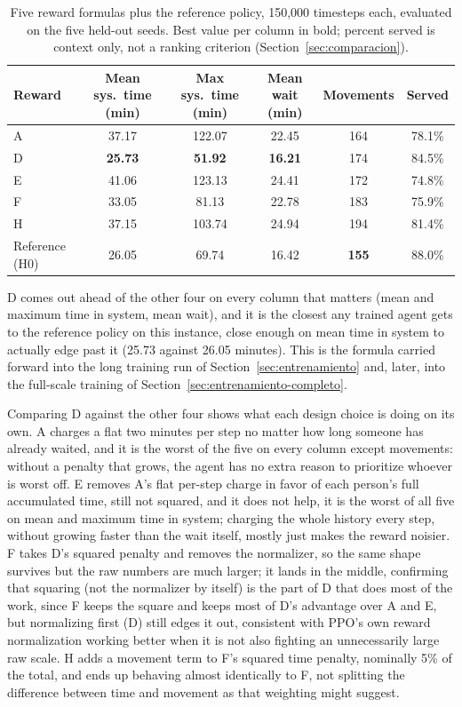 \documentclass[11pt,a4paper]{article}
\begin{document}
\begin{table}[H]
\centering
\caption{Five reward formulas plus the reference policy, 150{,}000 timesteps each, evaluated on the five held-out seeds. Best value per column in bold; percent served is context only, not a ranking criterion (Section~\ref{sec:comparacion}).}
\label{tab:prueba-rewards}
\scriptsize
\begin{tabular}{lccccc}
\toprule
Reward & Mean sys.\ time (min) & Max sys.\ time (min) & Mean wait (min) & Movements & Served \\
\midrule
A & 37.17 & 122.07 & 22.45 & 164 & 78.1\% \\
D & \textbf{25.73} & \textbf{51.92} & \textbf{16.21} & 174 & 84.5\% \\
E & 41.06 & 123.13 & 24.41 & 172 & 74.8\% \\
F & 33.05 & 81.13 & 22.78 & 183 & 75.9\% \\
H & 37.15 & 103.74 & 24.94 & 194 & 81.4\% \\
Reference (H0) & 26.05 & 69.74 & 16.42 & \textbf{155} & 88.0\% \\
\bottomrule
\end{tabular}
\end{table}

D comes out ahead of the other four on every column that matters (mean and maximum time in system, mean wait), and it is the closest any trained agent gets to the reference policy on this instance, close enough on mean time in system to actually edge past it (25.73 against 26.05 minutes). This is the formula carried forward into the long training run of Section~\ref{sec:entrenamiento} and, later, into the full-scale training of Section~\ref{sec:entrenamiento-completo}.

Comparing D against the other four shows what each design choice is doing on its own. A charges a flat two minutes per step no matter how long someone has already waited, and it is the worst of the five on every column except movements: without a penalty that grows, the agent has no extra reason to prioritize whoever is worst off. E removes A's flat per-step charge in favor of each person's full accumulated time, still not squared, and it does not help, it is the worst of all five on mean and maximum time in system; charging the whole history every step, without growing faster than the wait itself, mostly just makes the reward noisier. F takes D's squared penalty and removes the normalizer, so the same shape survives but the raw numbers are much larger; it lands in the middle, confirming that squaring (not the normalizer by itself) is the part of D that does most of the work, since F keeps the square and keeps most of D's advantage over A and E, but normalizing first (D) still edges it out, consistent with PPO's own reward normalization working better when it is not also fighting an unnecessarily large raw scale. H adds a movement term to F's squared time penalty, nominally 5\% of the total, and ends up behaving almost identically to F, not splitting the difference between time and movement as that weighting might suggest.
\end{document}
